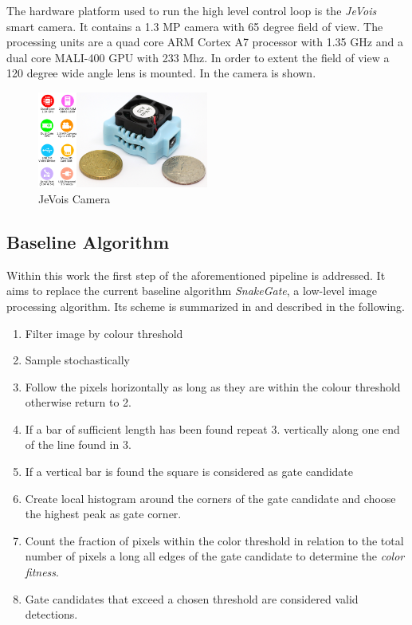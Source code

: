 The hardware platform used to run the high level control loop is the \textit{JeVois} smart camera. It contains a 1.3 MP camera with 65 degree field of view. The processing units are a quad core ARM Cortex A7 processor with 1.35 GHz and a dual core MALI-400 GPU with 233 Mhz. In order to extent the field of view a 120 degree wide angle lens is mounted. In  the camera is shown.

\begin{figure}[hbtp]
	\centering
	\includegraphics[width=0.5\textwidth]{fig/jevois}
	\caption{JeVois Camera}
	\label{fig:jevois}
\end{figure}

\subsection{Baseline Algorithm}

Within this work the first step of the aforementioned pipeline is addressed. It aims to replace the current baseline algorithm \textit{SnakeGate}, a low-level image processing algorithm. Its scheme is summarized in and described in the following.

\begin{enumerate}
	\item Filter image by colour threshold
	\item Sample stochastically 
	\item Follow the pixels horizontally as long as they are within the colour threshold otherwise return to 2.
	\item If a bar of sufficient length has been found repeat 3. vertically along one end of the line found in 3.
	\item If a vertical bar is found the square is considered as gate candidate
	\item Create local histogram around the corners of the gate candidate and choose the highest peak as gate corner.
	\item Count the fraction of pixels within the color threshold  in relation to the total number of pixels a long all edges of the gate candidate to determine the \textit{color fitness}.
	\item Gate candidates that exceed a chosen threshold are considered valid detections.
\end{enumerate}

